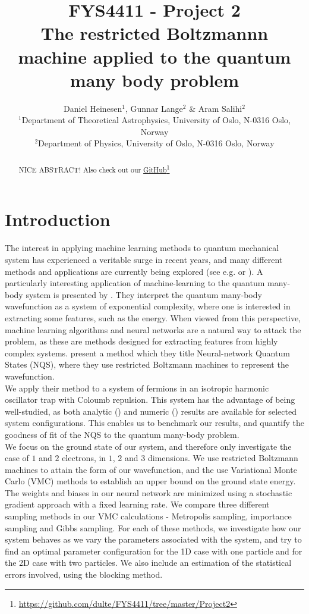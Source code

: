 \documentclass[a4paper, 10pt]{article}
\title{FYS4411 - Project 2\\
	The restricted Boltzmannn machine applied to the quantum many body problem}
\author{Daniel Heinesen$^1$, Gunnar Lange$^2$ \& Aram Salihi$^2$\\
	\small $^1$Department of Theoretical Astrophysics, University of Oslo, N-0316 Oslo, Norway\\
	\small $^2$Department of Physics, University of Oslo, N-0316 Oslo, Norway}
\begin{document}
	\maketitle
	\begin{abstract}
	\begin{center}
	 NICE ABSTRACT! Also check out our \href{https://github.com/dulte/FYS4411/tree/master/Project2}{GitHub}\footnote{\url{https://github.com/dulte/FYS4411/tree/master/Project2}}
\end{center}
	\end{abstract}
	\newpage
	\tableofcontents
	\newpage
	\section{Introduction}
	The interest in applying machine learning methods to quantum mechanical system has experienced a veritable surge in recent years, and many different methods and applications are currently being explored (see e.g. \cite{Broecker2017} or \cite{Botu2015}). A particularly interesting application of machine-learning to the quantum many-body system is presented by \cite{Carleo602}. They interpret the quantum many-body wavefunction as a system of exponential complexity, where one is interested in extracting some features, such as the energy. When viewed from this perspective, machine learning algorithms and neural networks are a natural way to attack the problem, as these are methods designed for extracting features from highly complex systems. \cite{Carleo602} present a method which they title Neural-network Quantum States (NQS), where they use restricted Boltzmann machines to represent the wavefunction.\\
	\linebreak
	We apply their method to a system of fermions in an isotropic harmonic oscillator trap with Coloumb repulsion. This system has the advantage of being well-studied, as both analytic (\cite{0305-4470-27-3-040}) and numeric (\cite{PhysRevB.84.115302}) results are available for selected system configurations. This enables us to benchmark our results, and quantify the goodness of fit of the NQS to the quantum many-body problem.\\
	\linebreak
	We focus on the ground state of our system, and therefore only investigate the case of $1$ and $2$ electrons, in $1$, $2$ and $3$ dimensions. We use restricted Boltzmann machines to attain the form of our wavefunction, and the use Variational Monte Carlo (VMC) methods to establish an upper bound on the ground state energy. The weights and biases in our neural network are minimized using a stochastic gradient approach with a fixed learning rate. We compare three different sampling methods in our VMC calculations - Metropolis sampling, importance sampling and Gibbs sampling. For each of these methods, we investigate how our system behaves as we vary the parameters associated with the system, and try to find an optimal parameter configuration for the 1D case with one particle and for the 2D case with two particles. We also include an estimation of the statistical errors involved, using the blocking method.
\end{document}
